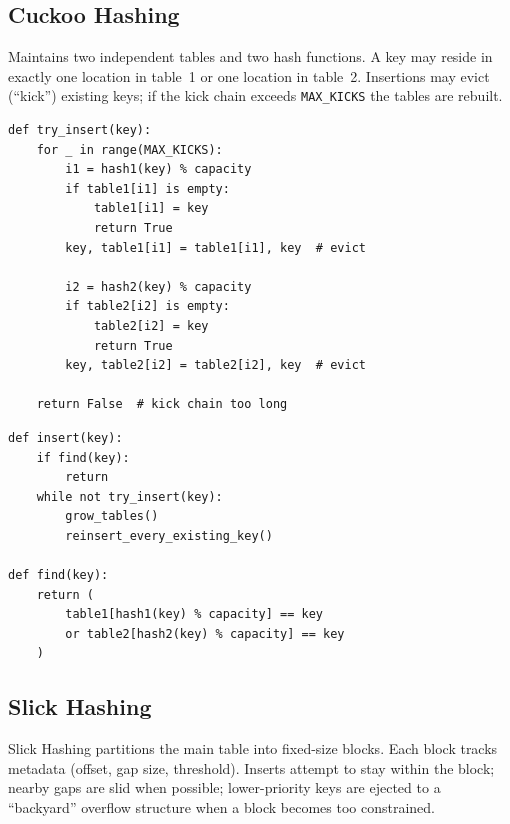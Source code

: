 \documentclass[11pt,a4paper]{article}
\begin{document}
\subsection{Cuckoo Hashing}

Maintains two independent tables and two hash functions. A key may reside in exactly one location in table~1 or one location in table~2. Insertions may evict (``kick'') existing keys; if the kick chain exceeds \texttt{MAX\_KICKS} the tables are rebuilt.

\begin{lstlisting}[style=pseudocode, caption={Cuckoo Hashing -- try\_insert (single kick round)}]
def try_insert(key):
    for _ in range(MAX_KICKS):
        i1 = hash1(key) % capacity
        if table1[i1] is empty:
            table1[i1] = key
            return True
        key, table1[i1] = table1[i1], key  # evict

        i2 = hash2(key) % capacity
        if table2[i2] is empty:
            table2[i2] = key
            return True
        key, table2[i2] = table2[i2], key  # evict

    return False  # kick chain too long
\end{lstlisting}

\begin{lstlisting}[style=pseudocode, caption={Cuckoo Hashing -- insert and find}]
def insert(key):
    if find(key):
        return
    while not try_insert(key):
        grow_tables()
        reinsert_every_existing_key()

def find(key):
    return (
        table1[hash1(key) % capacity] == key
        or table2[hash2(key) % capacity] == key
    )
\end{lstlisting}

\subsection{Slick Hashing}

Slick Hashing partitions the main table into fixed-size blocks. Each block tracks metadata (offset, gap size, threshold). Inserts attempt to stay within the block; nearby gaps are slid when possible; lower-priority keys are ejected to a ``backyard'' overflow structure when a block becomes too constrained.
\end{document}
